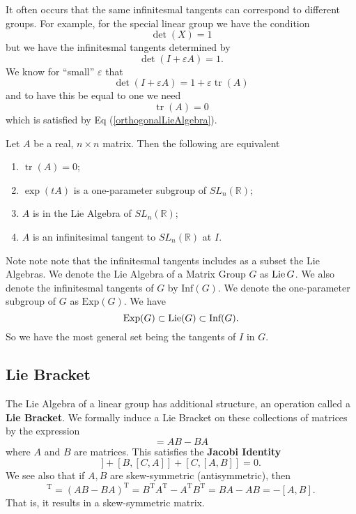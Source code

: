 It often occurs that the same infinitesmal tangents can correspond to different groups.
For example, for the special linear group we have the condition
\begin{equation}
\det(X) = 1
\end{equation}
but we have the infinitesmal tangents determined by
\begin{equation}
\det(I + \varepsilon A) = 1.
\end{equation}
We know for ``small'' $\varepsilon$ that
\begin{equation}
\det(I + \varepsilon A) = 1 + \varepsilon \operatorname{tr}(A)
\end{equation}
and to have this be equal to one we need
\begin{equation}
\operatorname{tr}(A) = 0
\end{equation}
which is satisfied by Eq (\ref{orthogonalLieAlgebra}).

\begin{thm}
Let $A$ be a real, $n\times n$ matrix. Then the following are equivalent
\begin{enumerate}
\item $\operatorname{tr}(A)=0$;
\item $\exp(tA)$ is a one-parameter subgroup of $SL_{n}(\mathbb{R})$;
\item $A$ is in the Lie Algebra of $SL_{n}(\mathbb{R})$;
\item $A$ is an infinitesimal tangent to $SL_{n}(\mathbb{R})$ at $I$.
\end{enumerate}
\end{thm}

Note note note that the infinitesmal tangents includes as a subset the Lie
Algebras. We denote the Lie Algebra of a Matrix Group $G$ as $\operatorname{Lie}{G}$. We also
denote the infinitesmal tangents of $G$ by $\textrm{Inf}(G)$.  We denote the
one-parameter subgroup of $G$ as $\textrm{Exp}(G)$. We have
\begin{equation}
\textrm{Exp}(G)\subset\operatorname{Lie}(G)\subset\textrm{Inf}(G).
\end{equation}
So we have the most general set being the tangents of $I$ in $G$.

\subsection{Lie Bracket}

The Lie Algebra of a linear group has additional structure, an operation called
a \textbf{Lie Bracket}. We formally induce a Lie Bracket on these collections 
of matrices by the expression
\begin{equation}
[A,B] = AB - BA
\end{equation}
where $A$ and $B$ are matrices. This satisfies the \textbf{Jacobi Identity}
\begin{equation}
[A,[B,C]] + [B,[C,A]] + [C,[A,B]] = 0.
\end{equation}
We see also that if $A,B$ are skew-symmetric (antisymmetric), then
\begin{equation}
[A,B]^\textrm{T} = (AB-BA)^\textrm{T} = B^\textrm{T}A^\textrm{T} - A^\textrm{T}B^\textrm{T} = BA-AB = -[A,B].
\end{equation}
That is, it results in a skew-symmetric matrix.

